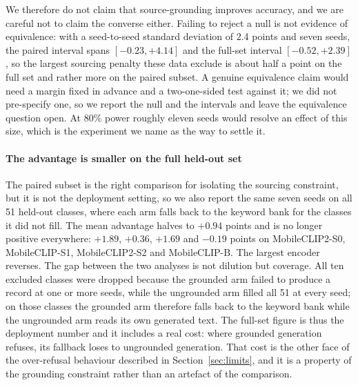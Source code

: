 \documentclass[a4paper,fleqn]{cas-dc}
\begin{document}
We therefore do not claim that source-grounding improves accuracy, and we are careful not to
claim the converse either. Failing to reject a null is not evidence of equivalence: with a
seed-to-seed standard deviation of 2.4 points and seven seeds, the paired interval spans
$[-0.23, +4.14]$ and the full-set interval $[-0.52, +2.39]$, so the largest sourcing penalty
these data exclude is about half a point on the full set and rather more on the paired
subset. A genuine equivalence claim would need a margin fixed in advance and a two-one-sided
test against it; we did not pre-specify one, so we report the null and the intervals and
leave the equivalence question open. At 80\% power roughly eleven seeds would resolve an
effect of this size, which is the experiment we name as the way to settle it.

\paragraph{The advantage is smaller on the full held-out set} The paired subset is the right
comparison for isolating the sourcing constraint, but it is not the deployment setting, so we also
report the same seven seeds on all 51 held-out classes, where each arm falls back to the keyword
bank for the classes it did not fill. The mean advantage halves to $+0.94$ points and is no longer
positive everywhere: $+1.89$, $+0.36$, $+1.69$ and $-0.19$ points on MobileCLIP2-S0, MobileCLIP-S1,
MobileCLIP2-S2 and MobileCLIP-B. The largest encoder reverses. %
The gap between the two analyses is
not dilution but coverage. All ten excluded classes were dropped because the grounded arm failed to
produce a record at one or more seeds, while the ungrounded arm filled all 51 at every seed; on
those classes the grounded arm therefore falls back to the keyword bank while the ungrounded arm
reads its own generated text. The full-set figure is thus the deployment number and it includes a
real cost: where grounded generation refuses, its fallback loses to ungrounded generation. That cost
is the other face of the over-refusal behaviour described in Section~\ref{sec:limits}, and it is a
property of the grounding constraint rather than an artefact of the comparison.
\end{document}
